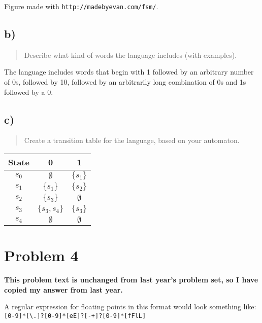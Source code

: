 \documentclass[12pt]{article}
\begin{document}
Figure made with \texttt{http://madebyevan.com/fsm/}.



\subsection{b)}
\begin{quote}
Describe what kind of words the language includes (with examples).
\end{quote}
The language includes words that begin with 1 followed by an arbitrary number of 0s, followed by 10, followed by an arbitrarily long combination of 0s and 1s followed by a 0.

\subsection{c)}
\begin{quote}
Create a transition table for the language, based on your automaton.
\end{quote}

\begin{center}

\begin{tabular}{c||cc}
	\hline \hline
	State & 0 & 1 \\ \hline
	$s_0$ & $\emptyset$ & $\{s_1\}$ \\
	$s_1$ & $\{s_1\}$ & $\{s_2\}$ \\
	$s_2$ & $\{s_3\}$ & $\emptyset$ \\
	$s_3$ & $\{s_3, s_4\}$ & $\{s_3\}$ \\
	$s_4$ & $\emptyset$ & $\emptyset$ \\ \hline
\end{tabular}

\end{center}

\section{Problem 4}
\textbf{This problem text is unchanged from last year's problem set, so I have copied my answer from last year.}

A regular expression for floating points in this format would look something like:
\texttt{[0-9]*[\textbackslash.]?[0-9]*[eE]?[-+]?[0-9]*[fFlL]}


\end{document}
